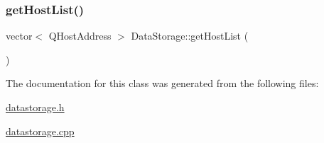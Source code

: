\mbox{\label{class_data_storage_a05e60f4e62fb68f588e3f381d40b6bbd}} 
\subsubsection{\texorpdfstring{get\+Host\+List()}{getHostList()}}
{\footnotesize\ttfamily vector$<$ Q\+Host\+Address $>$ Data\+Storage\+::get\+Host\+List (\begin{DoxyParamCaption}{ }\end{DoxyParamCaption})}



The documentation for this class was generated from the following files\+:\begin{DoxyCompactItemize}
\item 
\mbox{\hyperlink{datastorage_8h}{datastorage.\+h}}\item 
\mbox{\hyperlink{datastorage_8cpp}{datastorage.\+cpp}}\end{DoxyCompactItemize}
